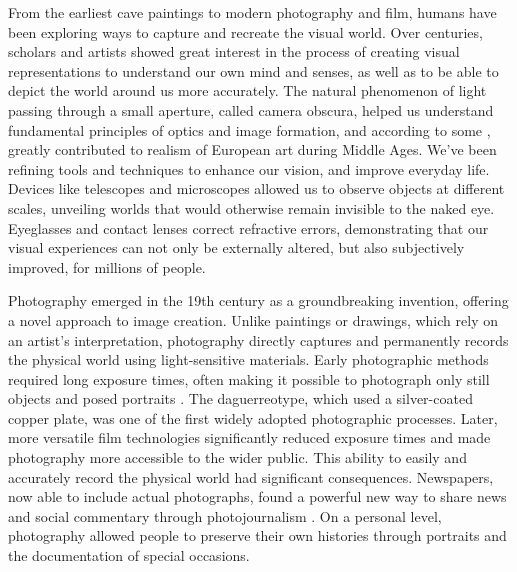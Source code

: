 From the earliest cave paintings \cite{wachtel-cave-art} to modern photography and film, humans have been exploring ways to capture and recreate the visual world. Over centuries, scholars and artists showed great interest \cite{honour-visual-arts-history} in the process of creating visual representations to understand our own mind and senses, as well as to be able to depict the world around us more accurately. The natural phenomenon of light passing through a small aperture, called camera obscura, helped us understand fundamental principles of optics and image formation, and according to some \cite{hockney-secret-knowledge}, greatly contributed to realism of European art during Middle Ages. We've been refining tools and techniques to enhance our vision, and improve everyday life. Devices like telescopes and microscopes allowed us to observe objects at different scales, unveiling worlds that would otherwise remain invisible to the naked eye. Eyeglasses and contact lenses correct refractive errors, demonstrating that our visual experiences can not only be externally altered, but also subjectively improved, for millions of people.



Photography emerged in the 19th century as a groundbreaking invention, offering a novel approach to image creation. Unlike paintings or drawings, which rely on an artist's interpretation, photography directly captures and permanently records the physical world using light-sensitive materials. Early photographic methods required long exposure times, often making it possible to photograph only still objects and posed portraits \cite{davenport1999history}. The daguerreotype, which used a silver-coated copper plate, was one of the first widely adopted photographic processes. Later, more versatile film technologies significantly reduced exposure times and made photography more accessible to the wider public. This ability to easily and accurately record the physical world had significant consequences. Newspapers, now able to include actual photographs, found a powerful new way to share news and social commentary through photojournalism \cite{gervais2020making}. On a personal level, photography allowed people to preserve their own histories through portraits and the documentation of special occasions.

